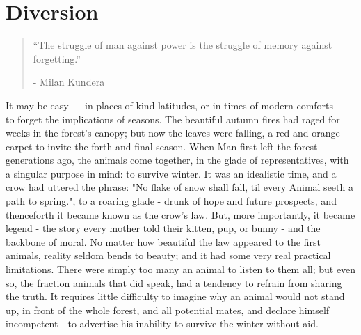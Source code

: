 \chapter{Diversion}

\vspace{-1.3cm}
\begin{localsize}{10}
	\begin{quote}
		“The struggle of man against power is the struggle of memory against forgetting.”
		\begin{flushright}- Milan Kundera \end{flushright}
	\end{quote} 
\end{localsize}
\vspace{1cm}


It may be easy — in places of kind latitudes, or in times of modern comforts — to forget the implications of seasons. The beautiful autumn fires had raged for weeks in the forest's canopy; but now the leaves were falling, a red and orange carpet to invite the forth and final season. 
When Man first left the forest generations ago, the animals come together, in the glade of representatives, with a singular purpose in mind: to survive winter. It was an idealistic time, and a crow had uttered the phrase: "No flake of snow shall fall, til every Animal seeth a path to spring.", to a roaring glade - drunk of hope and future prospects, and thenceforth it became known as the crow's law. But, more importantly, it became legend - the story every mother told their kitten, pup, or bunny - and the backbone of moral.
No matter how beautiful the law appeared to the first animals, reality seldom bends to beauty; and it had some very real practical limitations.
There were simply too many an animal to listen to them all; but even so, the fraction animals that did speak, had a tendency to refrain from sharing the truth. It requires little difficulty to imagine why an animal would not stand up, in front of the whole forest, and all potential mates, and declare himself incompetent - to advertise his inability to survive the winter without aid. 


 
